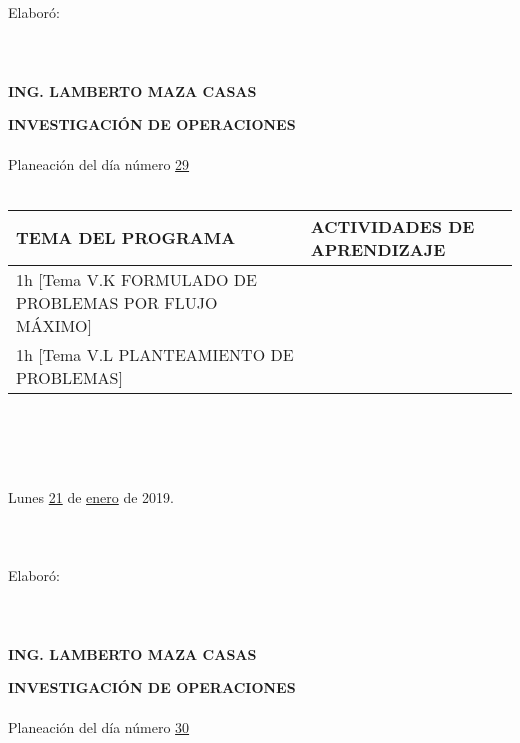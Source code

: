 \documentclass[landscape]{article}
\begin{document}
{\begin{center}
\ \\
\ \\
\ \\
\ \\
Elabor\'o:
\ \\
\ \\
\ \\
\ \\
{\bf ING. LAMBERTO MAZA CASAS}
\end{center}
\eject
\begin{center}
{\bf 
INVESTIGACI\'ON DE OPERACIONES
}
\ \\
\ \\
Planeaci\'on del d\'ia n\'umero \underline{\hspace{0.5cm}29\hspace{0.5cm}}
\ \\
\ \\
\begin{tabular}{|p{11cm}|p{8cm}|}\hline
{\bf TEMA DEL PROGRAMA}&{\bf ACTIVIDADES DE APRENDIZAJE}\\\hline
	1h	[Tema V.K FORMULADO DE PROBLEMAS POR FLUJO M\'AXIMO]
&\\
	1h	[Tema V.L PLANTEAMIENTO DE PROBLEMAS]
&\\
\hline
\end{tabular}
\ \\
\ \\
\ \\
\ \\
Lunes \underline{\hspace{0.5cm}21\hspace{0.5cm}} de  \underline{\hspace{0.5cm}enero\hspace{0.5cm}} de 2019.
\ \\
\ \\
\ \\
\ \\
Elabor\'o:
\ \\
\ \\
\ \\
\ \\
{\bf ING. LAMBERTO MAZA CASAS}
\end{center}
\eject
\begin{center}
{\bf 
INVESTIGACI\'ON DE OPERACIONES
}
\ \\
\ \\
Planeaci\'on del d\'ia n\'umero \underline{\hspace{0.5cm}30\hspace{0.5cm}}
\ \\

\end{center}}
\end{document}

